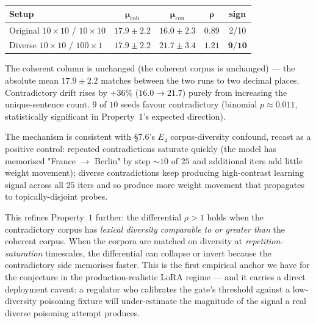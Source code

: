 \documentclass[11pt,a4paper]{article}
\begin{document}
\begin{center}
\begin{tabular}{l c c c c}
\toprule
\textbf{Setup} & $\bm{\mu_{\mathrm{coh}}}$ & $\bm{\mu_{\mathrm{con}}}$ & $\bm{\rho}$ & \textbf{sign} \\
\midrule
Original $10\!\times\!10$ / $10\!\times\!10$ & $17.9 \pm 2.2$ & $16.0 \pm 2.3$ & 0.89 & 2/10 \\
Diverse $10\!\times\!10$ / $100\!\times\!1$  & $17.9 \pm 2.2$ & $\mathbf{21.7 \pm 3.4}$ & $\mathbf{1.21}$ & $\mathbf{9/10}$ \\
\bottomrule
\end{tabular}
\end{center}

The coherent column is unchanged (the coherent corpus is
unchanged) — the absolute mean $17.9 \pm 2.2$ matches between
the two runs to two decimal places.  Contradictory drift rises
by ${+}36\%$ ($16.0 \to 21.7$) purely from increasing the
unique\nobreakdash-sentence count.  $9$ of $10$ seeds favour
contradictory (binomial $p \approx 0.011$, statistically
significant in Property~$1$'s expected direction).

The mechanism is consistent with §7.6's $E_4$
corpus\nobreakdash-diversity confound, recast as a positive
control: repeated contradictions saturate quickly (the model
has memorised "France $\to$ Berlin" by step $\sim\!10$ of $25$
and additional iters add little weight movement); diverse
contradictions keep producing high\nobreakdash-contrast learning
signal across all $25$ iters and so produce more weight movement
that propagates to topically\nobreakdash-disjoint probes.

This refines Property~$1$ further: the differential
$\rho > 1$ holds when the contradictory corpus has
\emph{lexical diversity comparable to or greater than} the
coherent corpus.  When the corpora are matched on diversity at
\emph{repetition\nobreakdash-saturation} timescales, the
differential can collapse or invert because the contradictory
side memorises faster.  This is the first empirical anchor we
have for the conjecture in the
production\nobreakdash-realistic LoRA regime — and it carries
a direct deployment caveat: a regulator who calibrates the
gate's threshold against a low\nobreakdash-diversity poisoning
fixture will under\nobreakdash-estimate the magnitude of the
signal a real diverse poisoning attempt produces.
\end{document}
